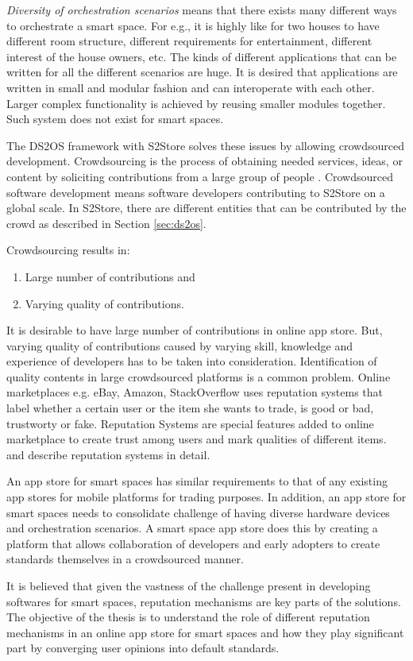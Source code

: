 \emph{Diversity of orchestration scenarios} means that there exists many different ways to orchestrate a smart space. For e.g., it is highly like for two houses to have different room structure, different requirements for entertainment, different interest of the house owners, etc. The kinds of different applications that can be written for all the different scenarios are huge. It is desired that applications are written in small and modular fashion and can interoperate with each other. Larger complex functionality is achieved by reusing smaller modules together. Such system does not exist for smart spaces.

The DS2OS framework with S2Store solves these issues by allowing crowdsourced development. Crowdsourcing is the process of obtaining needed services, ideas, or content by soliciting contributions from a large group of people \cite{pahl2014distributed}. Crowdsourced software development means software developers contributing to S2Store on a global scale. In S2Store, there are different entities that can be contributed by the crowd as described in Section \ref{sec:ds2os}.

Crowdsourcing results in:

\begin{enumerate}
  \item Large number of contributions and
  \item Varying quality of contributions.
\end{enumerate}

It is desirable to have large number of contributions in online app store. But, varying quality of contributions caused by varying skill, knowledge and experience of developers has to be taken into consideration. Identification of quality contents in large crowdsourced platforms is a common problem. Online marketplaces e.g. eBay, Amazon, StackOverflow uses reputation systems that label whether a certain user or the item she wants to trade, is good or bad, trustworty or fake. Reputation Systems are special features added to online marketplace to create trust among users and mark qualities of different items. \cite{Resnick2000} and \cite{farmer2010building} describe reputation systems in detail.

An app store for smart spaces has similar requirements to that of any existing app stores for mobile platforms for trading purposes. In addition, an app store for smart spaces needs to consolidate challenge of having diverse hardware devices and orchestration scenarios. A smart space app store does this by creating a platform that allows collaboration of developers and early adopters to create standards themselves in a crowdsourced manner.

It is believed that given the vastness of the challenge present in developing softwares for smart spaces, reputation mechanisms are key parts of the solutions. The objective of the thesis is to understand the role of different reputation mechanisms in an online app store for smart spaces and how they play significant part by converging user opinions into default standards.
